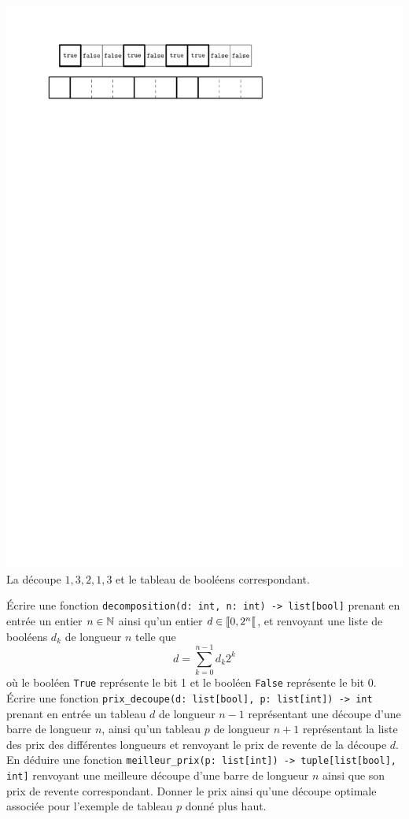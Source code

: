 \documentclass{magnolia}
\begin{document}
\begin{center}
\includegraphics{../../Commun/Images/info-cours-algo-decoupe}\\
La découpe $1, 3, 2, 1, 3$ et le tableau de booléens correspondant.
\end{center}

\begin{questions}
\question Écrire une fonction \verb!decomposition(d: int, n: int) -> list[bool]!
  prenant en entrée un entier $n\in\mathbb{N}$ ainsi qu'un entier $d\in\left\llbracket 0,2^n\right\llbracket$,
  et renvoyant une liste de booléens $d_k$ de longueur $n$ telle que
  \[d=\sum_{k=0}^{n-1} d_k 2^k\]
  où le booléen \verb!True! représente le bit 1 et le booléen \verb!False! représente
  le bit 0.
\question Écrire une fonction \verb!prix_decoupe(d: list[bool], p: list[int]) -> int!
  prenant en entrée un tableau $d$ de longueur $n-1$ représentant une découpe d'une
  barre de longueur $n$, ainsi qu'un tableau $p$ de longueur $n+1$ représentant la
  liste des prix des différentes longueurs et renvoyant le prix de revente de la découpe
  $d$.
\question En déduire une fonction \verb!meilleur_prix(p: list[int]) -> tuple[list[bool], int]! renvoyant une meilleure découpe d'une barre de longueur $n$ ainsi que son prix
de revente correspondant.
\question Donner le prix ainsi qu'une découpe optimale associée pour l'exemple de tableau
  $p$ donné plus haut. 
\end{questions}
\end{document}
